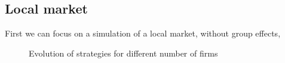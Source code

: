 \documentclass[american]{scrartcl}
\begin{document}
\subsection{Local market}

First we can focus on a simulation of a local market, without group effects,

\begin{figure}[h!]
    \hfill
    \hfill
    \hfill
    \caption{Evolution of strategies for different number of firms}
\end{figure}

\newpage
\nocite{*}
\printbibliography
\end{document}
